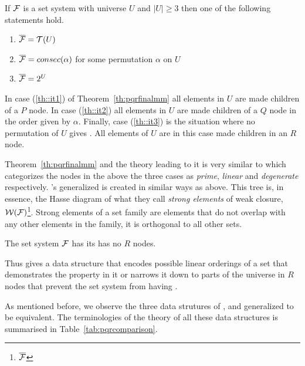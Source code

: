 \begin{theoremsansproof}[{\cite[Th.~9]{mm96}}] %
\label{th:pqrfinalmm}
If ${\cal F}$ is a set system with universe $U$ and $|U| \ge 3$ then one of
the following statements hold.
\begin{enumerate}
\item \label{th::it1} $\overline{{\cal F}} = {\cal T}(U)$ 
\item \label{th::it2}$\overline{{\cal F}} = consec(\alpha)$ for
  some permutation $\alpha$ on $U$ 
\item \label{th::it3}$\overline{{\cal F}} = 2^{U}$ 
\end{enumerate}
\end{theoremsansproof}

In case (\ref{th::it1}) of Theorem~\ref{th:pqrfinalmm} all elements in
$U$ are made children of a $P$ node. In case (\ref{th::it2}) all
elements in $U$ are made children of a $Q$ node in the order given by
$\alpha$. Finally, case (\ref{th::it3}) is the situation where no permutation
of $U$ gives \COP. All elements of $U$ are in this case made children
in an $R$ node.

Theorem~\ref{th:pqrfinalmm} and the theory leading to it is very
similar to \cite[esp. Th.~2.1, 3.5. also Th.~3.2, 3.3, 3.4]{mcc04}
which categorizes the nodes in the above the three cases as {\em
  prime}, {\em linear} and {\em degenerate}
respectively. \cite{mcc04}'s generalized \PQtree is created in similar
ways as \PQRtree above. This tree is, in essence, the Hasse diagram of
what they call {\em strong elements} of weak closure,
${\cal W}({\cal F})$\footnote{\ie $\overline{{\cal F}}$}. Strong elements of a set
family are elements that do not overlap with any other elements in the
family, \ie it is orthogonal to all other sets\cite[Def.~3.3]{mcc04}.

\begin{theoremsansproof}
The set system ${\cal F}$ has \COP \iff its \PQRtree has no $R$ nodes.  
\end{theoremsansproof}

Thus \PQRtree gives a data structure that encodes possible linear
orderings of a set that demonstrates the \COP property in it or
narrows it down to parts of the universe in $R$ nodes that prevent the
set system from having \COP.

As mentioned before, we observe the three data strutures of \PQRtree,
\gPQtree and generalized \PQtree to be equivalent. The terminologies
of the theory of all these data structures is summarised in
Table~\ref{tab:pqrcomparison}.

